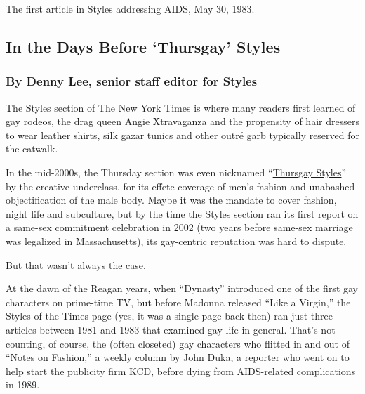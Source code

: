 The first article in Styles addressing AIDS, May 30, 1983.

\hypertarget{in-the-days-before-thursgay-styles}{%
\subsection{In the Days Before `Thursgay'
Styles}\label{in-the-days-before-thursgay-styles}}

\hypertarget{by-denny-lee-senior-staff-editor-for-styles}{%
\subsubsection{By Denny Lee, senior staff editor for
Styles}\label{by-denny-lee-senior-staff-editor-for-styles}}

The Styles section of The New York Times is where many readers first
learned of
\href{https://www.nytimes.com/1993/09/26/style/bustin-stereotypes.html}{gay
rodeos}, the drag queen
\href{https://www.nytimes.com/1993/04/18/style/paris-has-burned.html}{Angie
Xtravaganza} and the
\href{https://www.nytimes.com/1996/11/24/style/right-off-the-runway-and-into-the-salon.html}{propensity
of hair dressers} to wear leather shirts, silk gazar tunics and other
outré garb typically reserved for the catwalk.

In the mid-2000s, the Thursday section was even nicknamed
``\href{http://gawker.com/210347/thursgay-styles-my-what-big-package-you-have}{Thursgay
Styles}'' by the creative underclass, for its effete coverage of men's
fashion and unabashed objectification of the male body. Maybe it was the
mandate to cover fashion, night life and subculture, but by the time the
Styles section ran its first report on a
\href{https://www.nytimes.com/2002/08/18/us/times-will-begin-reporting-gay-couples-ceremonies.html}{same-sex
commitment celebration in 2002} (two years before same-sex marriage was
legalized in Massachusetts), its gay-centric reputation was hard to
dispute.

But that wasn't always the case.

At the dawn of the Reagan years, when ``Dynasty'' introduced one of the
first gay characters on prime-time TV, but before Madonna released
``Like a Virgin,'' the Styles of the Times page (yes, it was a single
page back then) ran just three articles between 1981 and 1983 that
examined gay life in general. That's not counting, of course, the (often
closeted) gay characters who flitted in and out of ``Notes on Fashion,''
a weekly column by
\href{https://www.nytimes.com/1989/01/23/obituaries/john-duka-39-former-times-writer-on-fashion-and-art.html}{John
Duka}, a reporter who went on to help start the publicity firm KCD,
before dying from AIDS-related complications in 1989.

